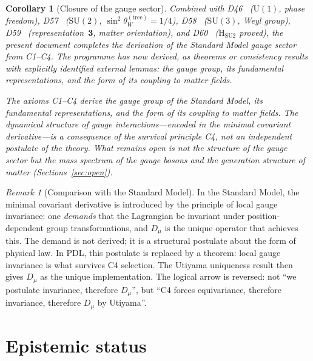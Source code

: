 \documentclass[11pt,a4paper]{article}
\theoremstyle{plain}
\newtheorem{corollary}[theorem]{Corollary}
\theoremstyle{definition}
\theoremstyle{remark}
\newtheorem{remark}[theorem]{Remark}
\newcommand{\PDL}{\textsc{PDL}}
\newcommand{\Uone}{\mathrm{U}(1)}
\newcommand{\SUtwo}{\mathrm{SU}(2)}
\newcommand{\SUthree}{\mathrm{SU}(3)}
\newcommand{\Dmu}{D_\mu}
\begin{document}
\begin{corollary}[Closure of the gauge sector]
\label{cor:closure}
Combined with D46~\cite{PDL_D46} ($\Uone$, phase freedom), D57~\cite{PDL_D57}
($\SUtwo$, $\sin^2\theta_W^{(\mathrm{tree})} = 1/4$), D58~\cite{PDL_D58}
($\SUthree$, Weyl group), D59~\cite{PDL_D59} (representation~$\mathbf{3}$, matter
orientation), and D60~\cite{PDL_D60} ($\mathrm{H_{SU2}}$ proved), the present
document completes the derivation of the Standard Model gauge sector from C1--C4.
The programme has now derived, as theorems or consistency results with explicitly
identified external lemmas: the gauge group, its fundamental representations, and
the form of its coupling to matter fields.

The axioms C1--C4 derive the gauge group of the Standard Model, its fundamental
representations, and the form of its coupling to matter fields. The dynamical
structure of gauge interactions---encoded in the minimal covariant derivative---is
a consequence of the survival principle C4, not an independent postulate of the
theory. What remains open is not the structure of the gauge sector but the
mass spectrum of the gauge bosons and the generation structure of matter
(Sections~\ref{sec:open}).
\end{corollary}

\begin{remark}[Comparison with the Standard Model]
In the Standard Model, the minimal covariant derivative is introduced by the
principle of local gauge invariance: one \emph{demands} that the Lagrangian be
invariant under position-dependent group transformations, and $\Dmu$ is the unique
operator that achieves this. The demand is not derived; it is a structural postulate
about the form of physical law. In \PDL, this postulate is replaced by a theorem:
local gauge invariance is what survives C4 selection. The Utiyama uniqueness result
then gives $\Dmu$ as the unique implementation. The logical arrow is reversed: not
``we postulate invariance, therefore $\Dmu$'', but ``C4 forces equivariance,
therefore invariance, therefore $\Dmu$ by Utiyama''.
\end{remark}

\section{Epistemic status}
\label{sec:epistemic}
\end{document}
